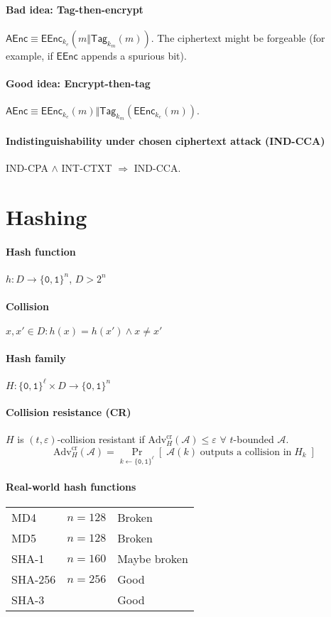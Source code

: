 \documentclass[11pt]{article}
\newcommand{\eqdef}{\ensuremath{\equiv}}
\newcommand{\AEnc}{\ensuremath{\mathsf{AEnc}}}
\newcommand{\EEnc}{\ensuremath{\mathsf{EEnc}}}
\newcommand{\Tag}{\ensuremath{\mathsf{Tag}}}
\newcommand{\eps}{\ensuremath{\varepsilon}}
\newcommand{\bit}{\ensuremath{\{\texttt{0},\texttt{1}\}}}
\theoremstyle{remark}
\begin{document}
\paragraph{Bad idea: Tag-then-encrypt}
$\AEnc \eqdef \EEnc_{k_e}( m \Vert \Tag_{k_m}(m) )$.
The ciphertext might be forgeable (for example,
if $\EEnc$ appends a spurious bit).

\paragraph{Good idea: Encrypt-then-tag}
$\AEnc \eqdef \EEnc_{k_e}(m) \Vert \Tag_{k_m}(\EEnc_{k_e}(m))$.

\paragraph{Indistinguishability under chosen ciphertext attack (IND-CCA)}
IND-CPA $\wedge$ INT-CTXT $\Rightarrow$ IND-CCA.

\section{Hashing}

\paragraph{Hash function} $h:D\rightarrow \bit^n$, $D > 2^n$

\paragraph{Collision} $x,x' \in D : h(x)=h(x') \wedge x \neq x'$

\paragraph{Hash family} $H : \bit^\ell \times D \rightarrow \bit^n$

\paragraph{Collision resistance (CR)}
$H$ is $(t,\eps)$-collision resistant if
$\text{Adv}_H^\text{cr}(\mathcal{A}) \le \eps$
$\forall$ $t$-bounded $\mathcal{A}$.
\[ \text{Adv}_H^\text{cr}(\mathcal{A}) = \Pr_{k\leftarrow\bit^\ell}
\left[\;\mathcal{A}(k)\;\textrm{outputs a collision in}\;H_k\;\right] \]

\paragraph{Real-world hash functions}
\begin{tabular}{lrl}
MD4 & $n=128$ & Broken \\
MD5 & $n=128$ & Broken \\
SHA-1 & $n=160$ & Maybe broken \\
SHA-256 & $n=256$ & Good \\
SHA-3 & & Good
\end{tabular}
\end{document}
